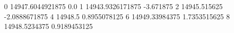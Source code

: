 0 14947.6044921875 0.0
1 14943.9326171875 -3.671875
2 14945.515625 -2.0888671875
4 14948.5 0.8955078125
6 14949.33984375 1.7353515625
8 14948.5234375 0.9189453125
